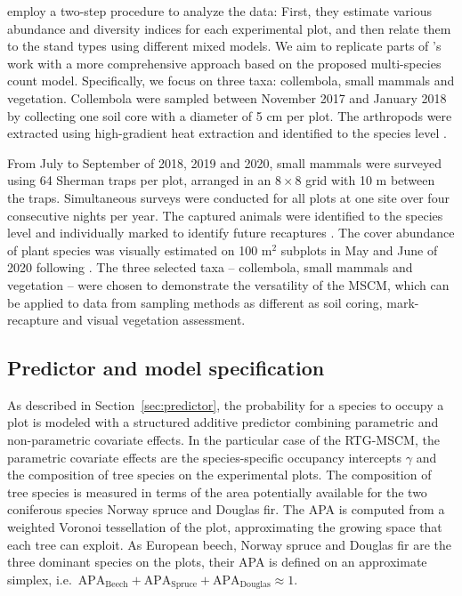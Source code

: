 \documentclass{article}
\begin{document}
\citet{glatthornSpecies2023} employ a two-step procedure to analyze the data: First, they estimate various abundance and diversity indices for each experimental plot, and then relate them to the stand types using different mixed models. We aim to replicate parts of \citeauthor{glatthornSpecies2023}'s work with a more comprehensive approach based on the proposed multi-species count model. Specifically, we focus on three taxa: collembola, small mammals and vegetation. Collembola were sampled between November 2017 and January 2018 by collecting one soil core with a diameter of 5 cm per plot. The arthropods were extracted using high-gradient heat extraction \citep{macfadyenImproved1961} and identified to the species level \citep{luCommunity2021}.

From July to September of 2018, 2019 and 2020, small mammals were surveyed using 64 Sherman traps per plot, arranged in an $8 \times 8$ grid with 10 m between the traps. Simultaneous surveys were conducted for all plots at one site over four consecutive nights per year. The captured animals were identified to the species level and individually marked to identify future recaptures \citep{glatthornSpecies2023}. The cover abundance of plant species was visually estimated on 100 m$^2$ subplots in May and June of 2020 following \citet{braun-blanquetPflanzensoziologie1951}. The three selected taxa -- collembola, small mammals and vegetation -- were chosen to demonstrate the versatility of the MSCM, which can be applied to data from sampling methods as different as soil coring, mark-recapture and visual vegetation assessment.

\subsection{Predictor and model specification}

As described in Section~\ref{sec:predictor}, the probability for a species to occupy a plot is modeled with a structured additive predictor combining parametric and non-parametric covariate effects. In the particular case of the RTG-MSCM, the parametric covariate effects are the species-specific occupancy intercepts $\gamma$ and the composition of tree species on the experimental plots. The composition of tree species is measured in terms of the area potentially available \citep[APA, ][]{glatthornSpatially2021} for the two coniferous species Norway spruce and Douglas fir. The APA is computed from a weighted Voronoi tessellation of the plot, approximating the growing space that each tree can exploit. As European beech, Norway spruce and Douglas fir are the three dominant species on the plots, their APA is defined on an approximate simplex, i.e.~$\text{APA}_\text{Beech} +\text{APA}_\text{Spruce} + \text{APA}_\text{Douglas} \approx 1$.
\end{document}
